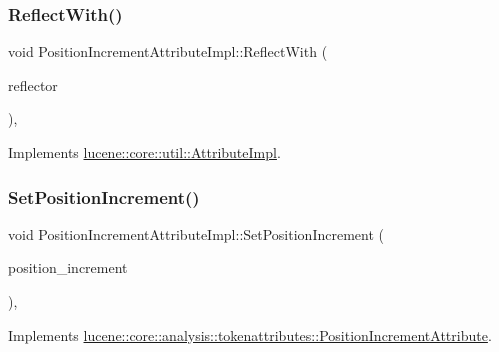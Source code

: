\subsubsection{\texorpdfstring{Reflect\+With()}{ReflectWith()}}
{\footnotesize\ttfamily void Position\+Increment\+Attribute\+Impl\+::\+Reflect\+With (\begin{DoxyParamCaption}\item[{\mbox{\hyperlink{namespacelucene_1_1core_1_1util_a7dbb701adaed055f73fb95eec83da10a}{lucene\+::core\+::util\+::\+Attribute\+Reflector}} \&}]{reflector }\end{DoxyParamCaption})\hspace{0.3cm}{\ttfamily [override]}, {\ttfamily [virtual]}}



Implements \mbox{\hyperlink{classlucene_1_1core_1_1util_1_1AttributeImpl_a84d34275fb1ed67ac36fad7ff6388096}{lucene\+::core\+::util\+::\+Attribute\+Impl}}.

\mbox{\label{classlucene_1_1core_1_1analysis_1_1tokenattributes_1_1PositionIncrementAttributeImpl_a7e1d05c2dab9f80a43df0def33f71c27}} 
\subsubsection{\texorpdfstring{Set\+Position\+Increment()}{SetPositionIncrement()}}
{\footnotesize\ttfamily void Position\+Increment\+Attribute\+Impl\+::\+Set\+Position\+Increment (\begin{DoxyParamCaption}\item[{const uint32\+\_\+t}]{position\+\_\+increment }\end{DoxyParamCaption})\hspace{0.3cm}{\ttfamily [override]}, {\ttfamily [virtual]}}



Implements \mbox{\hyperlink{classlucene_1_1core_1_1analysis_1_1tokenattributes_1_1PositionIncrementAttribute_a7d012852b01e0b16da72a911a90266b7}{lucene\+::core\+::analysis\+::tokenattributes\+::\+Position\+Increment\+Attribute}}.

